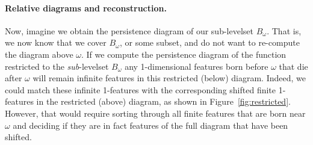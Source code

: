 \paragraph{Relative diagrams and reconstruction.}

Now, imagine we obtain the persistence diagram of our sub-levelset $B_\omega$.
That is, we now know that we cover $B_\omega$, or some subset, and do not want to re-compute the diagram above $\omega$.
If we compute the persistence diagram of the function restricted to the \emph{sub}-levelset $B_\omega$ any 1-dimensional features born before $\omega$ that die after $\omega$ will remain infinite features in this restricted (below) diagram.
Indeed, we could match these infinite 1-features with the corresponding shifted finite 1-features in the restricted (above) diagram, as shown in Figure~\ref{fig:restricted}.
However, that would require sorting through all finite features that are born near $\omega$ and deciding if they are in fact features of the full diagram that have been shifted.


